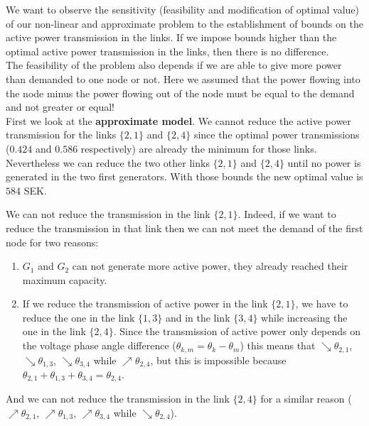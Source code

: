 We want to observe the sensitivity (feasibility and modification of optimal value) of our non-linear and approximate problem to the establishment of bounds on the active power transmission in the links. If we impose bounds higher than the optimal active power transmission in the links, then there is no difference.\\
The feasibility of the problem also depends if we are able to give more power than demanded to one node or not. Here we assumed that the power flowing into the node minus the power flowing out of the node must be equal to the demand and not greater or equal!\\

First we look at the \textbf{approximate model}. We cannot reduce the active power transmission for the links $\{2,1\}$ and $\{2,4\}$ since the optimal power transmissions ($0.424$ and $0.586$ respectively) are already the minimum for those links. Nevertheless we can reduce the two other links $\{2,1\}$ and $\{2,4\}$ until no power is generated in the two first generators. With those bounds the new optimal value is $584$ SEK.



\newpage

We can not reduce the transmission in the link $\{2,1\}$. Indeed, if we want to reduce the transmission in that link then we can not meet the demand of the first node for two reasons:
\begin{enumerate}
    \item $G_1$ and  $G_2$ can not generate more active power, they already reached their maximum capacity.
    \item If we reduce the transmission of active power in the link $\{2,1\}$, we have to reduce the one in the link $\{1,3\}$ and in the link $\{3,4\}$ while increasing the one in the link $\{2,4\}$. Since the transmission of active power only depends on the voltage phase angle difference ($\theta_{k,m} = \theta_k - \theta_m$) this means that $\searrow \theta_{2,1}$, $\searrow \theta_{1,3}$, $\searrow \theta_{3,4}$ while $\nearrow \theta_{2,4}$, but this is impossible because $\theta_{2,1} + \theta_{1,3}+\theta_{3,4} = \theta_{2,4}$. 
\end{enumerate}

And we can not reduce the transmission in the link $\{2,4\}$ for a similar reason ($\nearrow  \theta_{2,1}$, $\nearrow \theta_{1,3}$, $\nearrow \theta_{3,4}$ while $\searrow \theta_{2,4}$).\\

